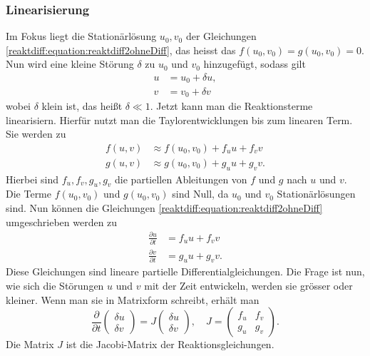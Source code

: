 \subsubsection{Linearisierung}
Im Fokus liegt die Stationärlösung \(u_0, v_0\) der Gleichungen \eqref{reaktdiff:equation:reaktdiff2ohneDiff}, das heisst das \(f(u_0,v_0) = g(u_0,v_0) = 0\).
Nun wird eine kleine Störung $\delta$ zu $u_0$ und $v_0$ hinzugefügt, sodass gilt
\begin{align*}
    u &= u_0 + \delta u,\\
    v &= v_0 + \delta v
\end{align*}
wobei $\delta$ klein ist, das heißt $\delta \ll 1$.
Jetzt kann man die Reaktionsterme linearisiern.
Hierfür nutzt man die Taylorentwicklungen bis zum linearen Term.
Sie werden zu
\begin{align}
    f(u,v) &\approx f(u_0,v_0) + f_u  u + f_v v\\
    g(u,v) &\approx g(u_0,v_0) + g_u  u + g_v v.
\end{align}
Hierbei sind \(f_u, f_v, g_u, g_v\) die partiellen Ableitungen von \(f\) und \(g\) nach \(u\) und \(v\).
Die Terme \(f(u_0,v_0)\) und \(g(u_0,v_0)\) sind Null, da \(u_0\) und \(v_0\) Stationärlösungen sind.
Nun können die Gleichungen \eqref{reaktdiff:equation:reaktdiff2ohneDiff} umgeschrieben werden zu
\begin{align}
    \label{reaktdiff:equation:reaktdiff2ohneDifflinearisiert1}
    \frac{\partial u}{\partial t} &= f_u u + f_v v\\
    \label{reaktdiff:equation:reaktdiff2ohneDifflinearisiert2}
    \frac{\partial v}{\partial t} &= g_u u + g_v  v.
\end{align}
Diese Gleichungen sind lineare partielle Differentialgleichungen.
Die Frage ist nun, wie sich die Störungen \(u\) und \(v\) mit der Zeit entwickeln, werden sie grösser oder kleiner.
Wenn man sie in Matrixform schreibt, erhält man
\begin{equation*}
    \label{reaktdiff:equation:reaktdiff2ohneDiffmatrix}
    \frac{\partial}{\partial t} \begin{pmatrix}
        \delta u\\
        \delta v
    \end{pmatrix} = 
    J 
    \begin{pmatrix}
        \delta u\\
        \delta v
    \end{pmatrix}
    , \quad
    J =
    \begin{pmatrix}
        f_u & f_v\\
        g_u & g_v
    \end{pmatrix}.
\end{equation*}
Die Matrix \(J\) ist die Jacobi-Matrix der Reaktionsgleichungen.

